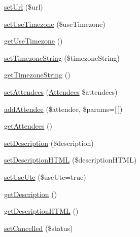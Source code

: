 \begin{DoxyCompactItemize}
\item 
\mbox{\hyperlink{class_eluceo_1_1i_cal_1_1_component_1_1_event_a35034248d6c68ad41e8cd70e6ba17481}{set\+Url}} (\$url)
\item 
\mbox{\hyperlink{class_eluceo_1_1i_cal_1_1_component_1_1_event_a73e24367751af65fcda2366c9df77409}{set\+Use\+Timezone}} (\$use\+Timezone)
\item 
\mbox{\hyperlink{class_eluceo_1_1i_cal_1_1_component_1_1_event_a322c6d3a65538cec8a4e1929439f4e0b}{get\+Use\+Timezone}} ()
\item 
\mbox{\hyperlink{class_eluceo_1_1i_cal_1_1_component_1_1_event_aad35266e1a18bcc58e56980ded6dddb6}{set\+Timezone\+String}} (\$timezone\+String)
\item 
\mbox{\hyperlink{class_eluceo_1_1i_cal_1_1_component_1_1_event_ad3838312a846ff44aaff17664a2bd97f}{get\+Timezone\+String}} ()
\item 
\mbox{\hyperlink{class_eluceo_1_1i_cal_1_1_component_1_1_event_a3862ad4e3fc4d0f8d7086f4889b11bd7}{set\+Attendees}} (\mbox{\hyperlink{class_eluceo_1_1i_cal_1_1_property_1_1_event_1_1_attendees}{Attendees}} \$attendees)
\item 
\mbox{\hyperlink{class_eluceo_1_1i_cal_1_1_component_1_1_event_aad2a226b84a661e22880f1d957b87483}{add\+Attendee}} (\$attendee, \$params=\mbox{[}$\,$\mbox{]})
\item 
\mbox{\hyperlink{class_eluceo_1_1i_cal_1_1_component_1_1_event_ac66aa81bc2f7351ff4e0c3c0d094f950}{get\+Attendees}} ()
\item 
\mbox{\hyperlink{class_eluceo_1_1i_cal_1_1_component_1_1_event_a508fb1d58b995b1864d8b02102ae3a93}{set\+Description}} (\$description)
\item 
\mbox{\hyperlink{class_eluceo_1_1i_cal_1_1_component_1_1_event_a82490c5b0b85400e224ccf51fbc322ff}{set\+Description\+H\+T\+ML}} (\$description\+H\+T\+ML)
\item 
\mbox{\hyperlink{class_eluceo_1_1i_cal_1_1_component_1_1_event_ad086e385a56e162445e662ccce2715b9}{set\+Use\+Utc}} (\$use\+Utc=true)
\item 
\mbox{\hyperlink{class_eluceo_1_1i_cal_1_1_component_1_1_event_ab0ee0f0236cf69196fcf15486d484b87}{get\+Description}} ()
\item 
\mbox{\hyperlink{class_eluceo_1_1i_cal_1_1_component_1_1_event_a4f61de8559b60de296b00c2ed5fc4e27}{get\+Description\+H\+T\+ML}} ()
\item 
\mbox{\hyperlink{class_eluceo_1_1i_cal_1_1_component_1_1_event_a1a81af119a481d672fe0f4ad2610a502}{set\+Cancelled}} (\$status)
\item 

\end{DoxyCompactItemize}
